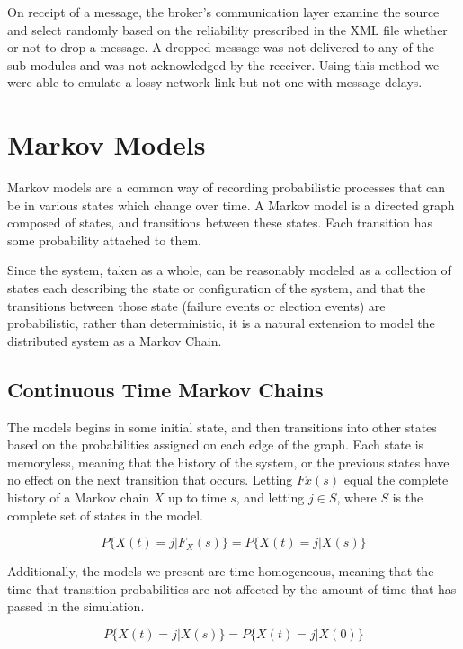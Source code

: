 On receipt of a message, the broker's communication layer examine the source and select randomly based on the reliability prescribed in the XML file whether or not to drop a message. A dropped message was not delivered to any of the sub-modules and was not acknowledged by the receiver. Using this method we were able to emulate a lossy network link but not one with message delays.

\section{Markov Models}

Markov models are a common way of recording probabilistic processes that can be in various states which change over time. A Markov model is a directed graph composed of states, and transitions between these states. Each transition has some probability attached to them.

Since the system, taken as a whole, can be reasonably modeled as a collection of states each describing the state or configuration of the system, and that the transitions between those state (failure events or election events) are probabilistic, rather than deterministic, it is a natural extension to model the distributed system as a Markov Chain.

\subsection{Continuous Time Markov Chains}

The models begins in some initial state, and then transitions into other states based on the probabilities assigned on each edge of the graph. Each state is memoryless, meaning that the history of the system, or the previous states have no effect on the next transition that occurs. Letting $Fx(s)$ equal the complete history of a Markov chain $X$ up to time $s$, and letting $j \in S$, where $S$ is the complete set of states in the model.

\begin{equation}
P\{ X(t)=j | F_X(s) \} = P\{ X(t)=j | X(s) \}
\end{equation}

Additionally, the models we present are time homogeneous, meaning that the time that transition probabilities are not affected by the amount of time that has passed in the simulation. 

\begin{equation}
P\{ X(t)=j | X(s) \} = P\{ X(t)=j | X(0) \}
\end{equation}

